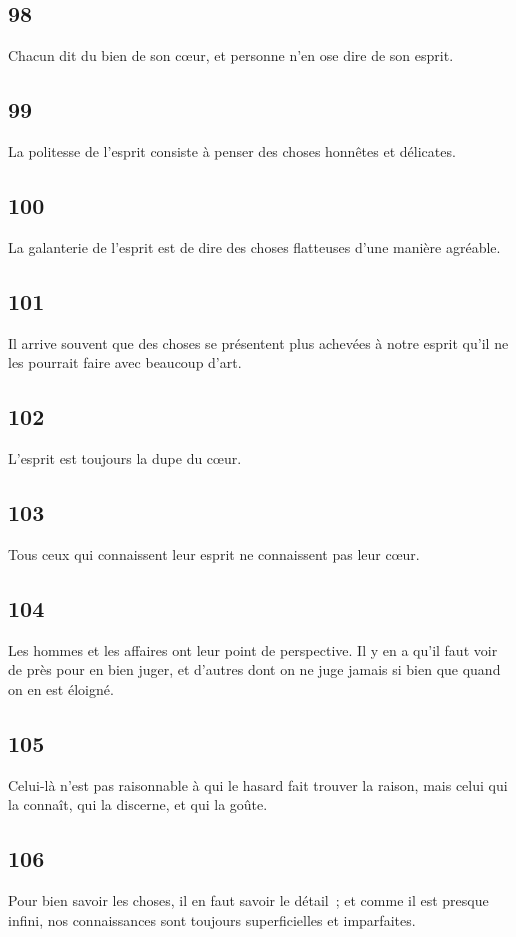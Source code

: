 \documentclass[french,twoside]{book} %
\begin{document}
\subsection[{98}]{ \textsc{98} }
\noindent Chacun dit du bien de son cœur, et personne n’en ose dire de son esprit.
\subsection[{99}]{ \textsc{99} }
\noindent La politesse de l’esprit consiste à penser des choses honnêtes et délicates.
\subsection[{100}]{ \textsc{100} }
\noindent La galanterie de l’esprit est de dire des choses flatteuses d’une manière agréable.
\subsection[{101}]{ \textsc{101} }
\noindent Il arrive souvent que des choses se présentent plus achevées à notre esprit qu’il ne les pourrait faire avec beaucoup d’art.
\subsection[{102}]{ \textsc{102} }
\noindent L’esprit est toujours la dupe du cœur.
\subsection[{103}]{ \textsc{103} }
\noindent Tous ceux qui connaissent leur esprit ne connaissent pas leur cœur.
\subsection[{104}]{ \textsc{104} }
\noindent Les hommes et les affaires ont leur point de perspective. Il y en a qu’il faut voir de près pour en bien juger, et d’autres dont on ne juge jamais si bien que quand on en est éloigné.
\subsection[{105}]{ \textsc{105} }
\noindent Celui-là n’est pas raisonnable à qui le hasard fait trouver la raison, mais celui qui la connaît, qui la discerne, et qui la goûte.
\subsection[{106}]{ \textsc{106} }
\noindent Pour bien savoir les choses, il en faut savoir le détail ; et comme il est presque infini, nos connaissances sont toujours superficielles et imparfaites.
\end{document}
